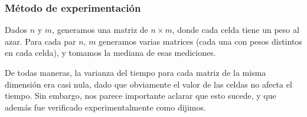 \subsubsection{M\'etodo de experimentación}

Dados $n$ y $m$, generamos una matriz de $n \times m$, donde cada celda tiene un peso al azar. Para cada par $n$, $m$ generamos varias matrices (cada una con pesos distintos en cada celda), y tomamos la mediana de esas mediciones. 

De todas maneras, la varianza del tiempo para cada matriz de la misma dimensión era casi nula, dado que obviamente el valor de las celdas no afecta el tiempo. Sin embargo, nos parece importante aclarar que esto sucede, y que además fue verificado experimentalmente como dijimos.


